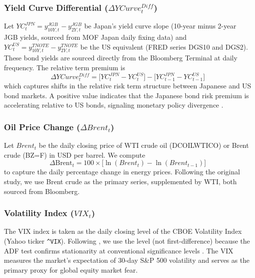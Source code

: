 \documentclass[12pt]{article}
\begin{document}
\subsubsection{Yield Curve Differential ($\Delta YCurve^{Diff}_t$)}
{} Let $YC_t^{JPN} = y_{10Y,t}^{JGB} - y_{2Y,t}^{JGB}$ be Japan's yield curve slope (10-year minus 2-year JGB yields, sourced from MOF Japan daily fixing data) and $YC_t^{US} = y_{10Y,t}^{TNOTE} - y_{2Y,t}^{TNOTE}$ be the US equivalent (FRED series DGS10 and DGS2). These bond yields are sourced directly from the Bloomberg Terminal at daily frequency. The relative term premium is \begin{equation} \Delta YCurve^{Diff}_t = \big[ YC_t^{JPN} - YC_t^{US} \big] - \big[ YC_{t-1}^{JPN} - YC_{t-1}^{US} \big] \end{equation} which captures shifts in the relative risk term structure between Japanese and US bond markets. A positive value indicates that the Japanese bond risk premium is accelerating relative to US bonds, signaling monetary policy divergence \parencite{guyot2026risk}.

\subsubsection{Oil Price Change ($\Delta Brent_t$)}
{} Let $Brent_t$ be the daily closing price of WTI crude oil (DCOILWTICO) or Brent crude (BZ=F) in USD per barrel. We compute \begin{equation} \Delta \text{Brent}_t = 100 \times \big[ \ln(Brent_t) - \ln(Brent_{t-1}) \big] \end{equation} to capture the daily percentage change in energy prices. Following the original study, we use Brent crude as the primary series, supplemented by WTI, both sourced from Bloomberg.

\subsubsection{Volatility Index ($VIX_t$)}
{} The VIX index is taken as the daily closing level of the CBOE Volatility Index (Yahoo ticker \texttt{\textasciicircum VIX}). Following \textcite{guyot2026risk}, we use the level (not first-difference) because the ADF test confirms stationarity at conventional significance levels \parencite{brunnermeier2009carry}. The VIX measures the market's expectation of 30-day S\&P 500 volatility and serves as the primary proxy for global equity market fear.
\end{document}
